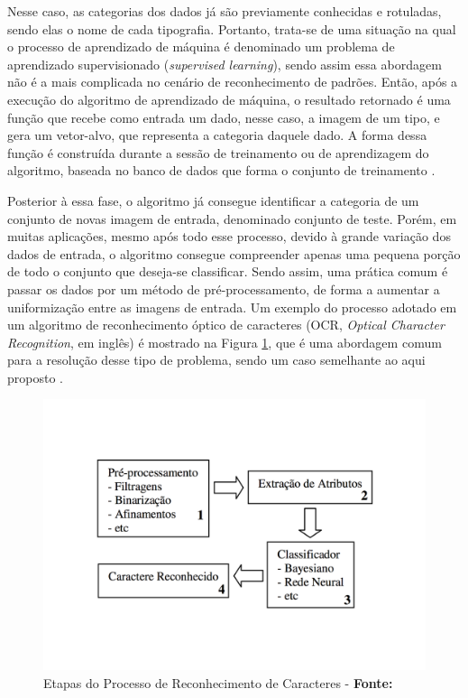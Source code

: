 Nesse caso, as categorias dos dados já são previamente conhecidas e rotuladas, sendo elas o nome de cada tipografia. Portanto, trata-se de uma situação na qual o processo de aprendizado de máquina é denominado um problema de aprendizado supervisionado (\textit{supervised learning}), sendo assim essa abordagem não é a mais complicada no cenário de reconhecimento de padrões. Então, após a execução do algoritmo de aprendizado de máquina, o resultado retornado é uma função que recebe como entrada um dado, nesse caso, a imagem de um tipo, e gera um vetor-alvo, que representa a categoria daquele dado. A forma dessa função é construída durante a sessão de treinamento ou de aprendizagem do algoritmo, baseada no banco de dados que forma o conjunto de treinamento .

Posterior à essa fase, o algoritmo já consegue identificar a categoria de um conjunto de novas imagem de entrada, denominado conjunto de teste. Porém, em muitas aplicações, mesmo após todo esse processo, devido à grande variação dos dados de entrada, o algoritmo consegue compreender apenas uma pequena porção de todo o conjunto que deseja-se classificar. Sendo assim, uma prática comum é passar os dados por um método de pré-processamento, de forma a aumentar a uniformização entre as imagens de entrada. Um exemplo do processo adotado em um algoritmo de reconhecimento óptico de caracteres (OCR, \textit{Optical Character Recognition}, em inglês) é mostrado na Figura \ref{fig:etapas}, que é uma abordagem comum para a resolução desse tipo de problema, sendo um caso semelhante ao aqui proposto  .

\begin{figure}[H]
  \centering
  \includegraphics[width=0.7\linewidth]{figuras/etapaProcessamento.pdf}
  \caption{Etapas do Processo de Reconhecimento de Caracteres - \textbf{Fonte:} }
  \label{fig:etapas}
\end{figure}

